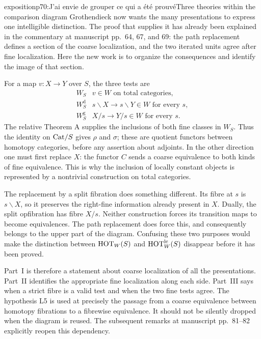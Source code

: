 \begin{dcomment}{exposition}{p70:J'ai envie de grouper ce qui a été prouvé}{Three theories within the comparison diagram}
Grothendieck now wants the many presentations to express one intelligible distinction. The proof that supplies it has already been explained in the commentary at manuscript pp.~64, 67, and 69: the path replacement defines a section of the coarse localization, and the two iterated units agree after fine localization. Here the new work is to organize the consequences and identify the image of that section.

For a map $v:X\to Y$ over $S$, the three tests are
\[
\begin{array}{c|l}
 W_S&v\in W\text{ on total categories},\\
 W_S^{\mathrm d}&s\backslash X\longrightarrow s\backslash Y\in W
                    \text{ for every }s,\\
 W_S^{\mathrm g}&X/s\longrightarrow Y/s\in W
                    \text{ for every }s.
\end{array}
\]
The relative Theorem A supplies the inclusions of both fine classes in $W_S$. Thus the identity on $\mathrm{Cat}/S$ gives $\rho$ and $\sigma$; these are quotient functors between homotopy categories, before any assertion about adjoints. In the other direction one must first replace $X$: the functor $C$ sends a coarse equivalence to both kinds of fine equivalence. This is why the inclusion of locally constant objects is represented by a nontrivial construction on total categories.

The replacement by a split fibration does something different. Its fibre at $s$ is $s\backslash X$, so it preserves the right-fine information already present in $X$. Dually, the split opfibration has fibre $X/s$. Neither construction forces its transition maps to become equivalences. The path replacement does force this, and consequently belongs to the upper part of the diagram. Confusing these two purposes would make the distinction between $\mathrm{HOT}_W(S)$ and $\mathrm{HOT}_W^{\mathrm{lc}}(S)$ disappear before it has been proved.

Part~I is therefore a statement about coarse localization of all the presentations. Part~II identifies the appropriate fine localization along each side. Part~III says when a strict fibre is a valid test and when the two fine tests agree. The hypothesis L5 is used at precisely the passage from a coarse equivalence between homotopy fibrations to a fibrewise equivalence. It should not be silently dropped when the diagram is reused. The subsequent remarks at manuscript pp.~81--82 explicitly reopen this dependency.
\end{dcomment}


